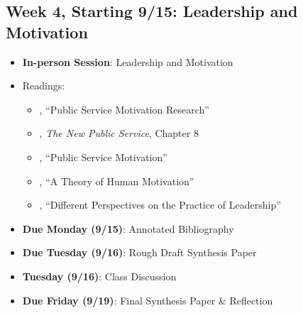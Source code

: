 \documentclass[12pt]{article}     %
\begin{document}
\subsection*{Week 4, Starting 9/15: Leadership and Motivation}
\begin{itemize}
    \item \textbf{In-person Session}: Leadership and Motivation
    \item Readings:
        \begin{itemize}
            \item \citet{Christensen2017}, ``Public Service Motivation Research'' 
            \item \citet{Denhardt2015}, \emph{The New Public Service}, Chapter 8 
            \item \citet{Lachance2017}, ``Public Service Motivation'' 
            \item \citet{maslow1943}, ``A Theory of Human Motivation'' 
            \item \citet{Fairholm2004}, ``Different Perspectives on the Practice of Leadership'' 
        \end{itemize}
    \item \textbf{Due Monday (9/15)}: Annotated Bibliography
    \item \textbf{Due Tuesday (9/16)}: Rough Draft Synthesis Paper
    \item \textbf{Tuesday (9/16)}: Class Discussion
    \item \textbf{Due Friday (9/19)}: Final Synthesis Paper \& Reflection
\end{itemize}
\end{document}
